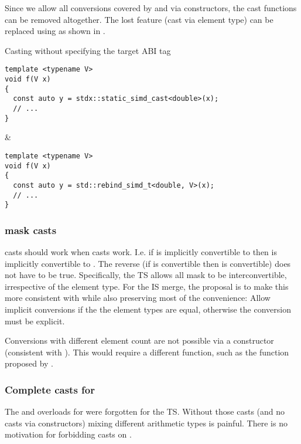 Since we allow all conversions covered by \stdx{} and
\stdx{} via \std{} constructors, the cast
functions can be removed altogether.
The lost feature (cast via element type) can be replaced using
 as shown in .
\begin{tonytable}[Parallelism TS 2]{Casting without specifying the target ABI tag}\label{tt:tsvsp1928casts}
  \begin{lstlisting}
template <typename V>
void f(V x)
{
  const auto y = stdx::static_simd_cast<double>(x);
  // ...
}
  \end{lstlisting}
  &
  \begin{lstlisting}
template <typename V>
void f(V x)
{
  const auto y = std::rebind_simd_t<double, V>(x);
  // ...
}
  \end{lstlisting}
\end{tonytable}%

\subsubsection{mask casts}
 casts should work when  casts work.
I.e. if  is implicitly convertible to 
then  is implicitly convertible to .
The reverse (if  is convertible then  is
convertible) does not have to be true.
Specifically, the TS allows all  mask to be
interconvertible, irrespective of the element type.
For the IS merge, the proposal is to make this more consistent with 
while also preserving most of the convenience:
Allow implicit conversions if the  the element types are equal,
otherwise the conversion must be explicit.

Conversions with different element count are not possible via a constructor
(consistent with ).
This would require a different function, such as the 
function proposed by \textcite{P2638R0}.

\subsubsection{Complete casts for }
The  and  overloads for  were forgotten for the TS.
Without those casts (and no casts via constructors) mixing different arithmetic types is painful.
There is no motivation for forbidding casts on .

